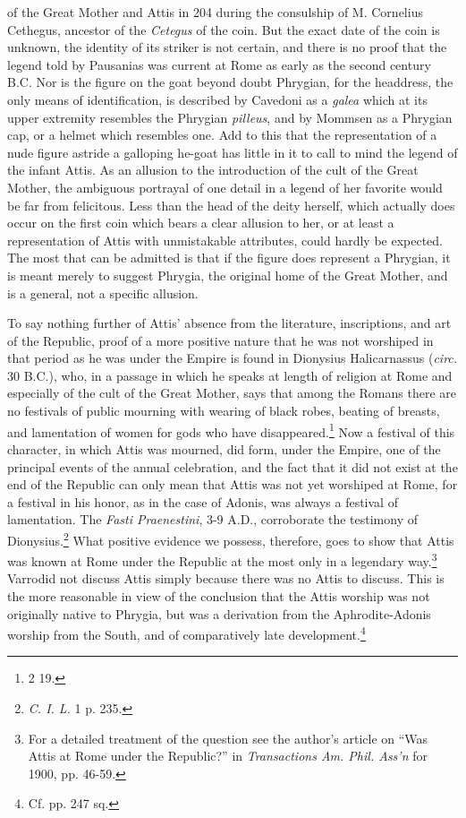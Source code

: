 \documentclass[a4paper, 11pt, oneside, polutonikogreek, english]{article}
\begin{document}
of the Great Mother and Attis in 204 during the consulship of M. Cornelius Cethegus, ancestor of the \emph{Cetegus} of the coin. But the exact date of the coin is unknown, the identity of its striker is not certain, and there is no proof that the legend told by Pausanias was current at Rome as early as the second century \textsc{B.C.} Nor is the figure on the goat beyond doubt Phrygian, for the headdress, the only means of identification, is described by Cavedoni as a \emph{galea} which at its upper extremity resembles the Phrygian \emph{pilleus}, and by Mommsen as a Phrygian cap, or a helmet which resembles one. Add to this that the representation of a nude figure astride a galloping he-goat has little in it to call to mind the legend of the infant Attis. As an allusion to the introduction of the cult of the Great Mother, the ambiguous portrayal of one detail in a legend of her favorite would be far from felicitous. Less than the head of the deity herself, which actually does occur on the first coin which bears a clear allusion to her, or at least a representation of Attis with unmistakable attributes, could hardly be expected. The most that can be admitted is that if the figure does represent a Phrygian, it is meant merely to suggest Phrygia, the original home of the Great Mother, and is a general, not a specific allusion.

To say nothing further of Attis' absence from the literature, inscriptions, and art of the Republic, proof of a more positive nature that he was not worshiped in that period as he was under the Empire is found in Dionysius Halicarnassus (\emph{circ.} 30 \textsc{B.C.}), who, in a passage in which he speaks at length of religion at Rome and especially of the cult of the Great Mother, says that among the Romans there are no festivals of public mourning with wearing of black robes, beating of breasts, and lamentation of women for gods who have disappeared.\footnote{2 19.} Now a festival of this character, in which Attis was mourned, did form, under the Empire, one of the principal events of the annual celebration, and the fact that it did not exist at the end of the Republic can only mean that Attis was not yet worshiped at Rome, for a festival in his honor, as in the case of Adonis, was always a festival of lamentation. The \emph{Fasti Praenestini}, 3-9 \textsc{A.D.}, corroborate the testimony of Dionysius.\footnote{\emph{C. I. L.} 1 p. 235.} What positive evidence we possess, therefore, goes to show that Attis was known at Rome under the Republic at the most only in a legendary way.\footnote{For a detailed treatment of the question see the author's article on ``Was Attis at Rome under the Republic?'' in \emph{Transactions Am. Phil. Ass'n} for 1900, pp. 46-59.} Varrodid not discuss Attis simply because there was no Attis to discuss. This is the more reasonable in view of the conclusion that the Attis worship was not originally native to Phrygia, but was a derivation from the Aphrodite-Adonis worship from the South, and of comparatively late development.\footnote{Cf. pp. 247 sq.}
\end{document}
